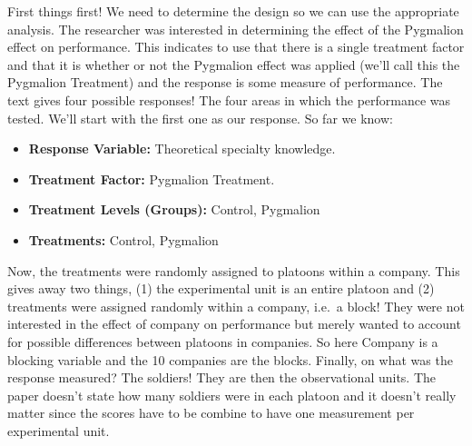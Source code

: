 \documentclass[
  letterpaper,
]{book}
\providecommand{\tightlist}{%
  \setlength{\itemsep}{0pt}\setlength{\parskip}{0pt}}\usepackage{longtable,booktabs,array}
\begin{document}

First things first! We need to determine the design so we can use the
appropriate analysis. The researcher was interested in determining the
effect of the Pygmalion effect on performance. This indicates to use
that there is a single treatment factor and that it is whether or not
the Pygmalion effect was applied (we'll call this the Pygmalion
Treatment) and the response is some measure of performance. The text
gives four possible responses! The four areas in which the performance
was tested. We'll start with the first one as our response. So far we
know:


\begin{itemize}
\tightlist
\item
  \textbf{Response Variable:} Theoretical specialty knowledge.
\item
  \textbf{Treatment Factor:} Pygmalion Treatment.
\item
  \textbf{Treatment Levels (Groups):} Control, Pygmalion
\item
  \textbf{Treatments:} Control, Pygmalion
\end{itemize}

Now, the treatments were randomly assigned to platoons within a company.
This gives away two things, (1) the experimental unit is an entire
platoon and (2) treatments were assigned randomly within a company,
i.e.~a block! They were not interested in the effect of company on
performance but merely wanted to account for possible differences
between platoons in companies. So here Company is a blocking variable
and the 10 companies are the blocks. Finally, on what was the response
measured? The soldiers! They are then the observational units. The paper
doesn't state how many soldiers were in each platoon and it doesn't
really matter since the scores have to be combine to have one
measurement per experimental unit.
\end{document}
